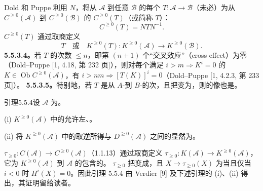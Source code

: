 Dold 和 Puppe 利用 $N$，将从 $\mathscr A$ 到任意 $\mathscr B$ 的每个 $T:\mathscr A\to\mathscr B$（未必）为从 $C^{\geq0}(\mathscr A)$ 到 $C^{\geq0}(\mathscr B)$ 的 $C^{\geq0}(T)$（或简称 $T$）：
\begin{equation}\tag{5.5.3.2}C^{\geq0}(T)=NTN^{-1}.\end{equation}
 $C^{\geq0}(T)$ 通过取商定义
\begin{equation}\tag{5.5.3.3}T\quad\text{或}\quad K^{\geq0}(T):K^{\geq0}(\mathscr A)\longrightarrow K^{\geq0}(\mathscr B).\end{equation}
\textbf{5.5.3.4。}若 $T$ 的次数 $\leq n$，即第 $(n+1)$ 个“交叉效应”（cross effect）为零（Dold--Puppe [1, 4.18, 第 232 页]），则对每个满足 $i>m\Rightarrow K^i=0$ 的 $K\in\operatorname{Ob}C^{\geq0}(\mathscr A)$，有 $i>nm\Rightarrow[T(K)]^i=0$（Dold--Puppe [1, 4.2.3, 第 233 页]）。
\textbf{5.5.3.5。}特别地，若 $T$ 是从 $A$-到 $B$-的次，且把变为，则的像也是。
\begin{SGAresult}{引理}{5.5.4}设 $\mathscr A$ 为。

(i) $K^{\geq0}(\mathscr A)$ 中的允许左、。

(ii) 将 $K^{\geq0}(\mathscr A)$ 中的取逆所得与 $D^{\geq0}(\mathscr A)$ 之间的显然为。
\end{SGAresult}
 $\tau_{\geq0}:C(\mathscr A)\to C^{\geq0}(\mathscr A)$（1.1.13）通过取商定义 $\tau_{\geq0}:K(\mathscr A)\to K^{\geq0}(\mathscr A)$，它为 $K^{\geq0}(\mathscr A)$ 到 $\mathscr A$ 的包含的。 $\tau_{\geq0}$ 把变成，且 $X\to\tau_{\geq0}(X)$ 为当且仅当 $i<0$ 时 $H^i(X)=0$。因此引理 5.5.4 由 Verdier [9] 及下述引理的 (i)、(ii) 得出，其证明留给读者。
